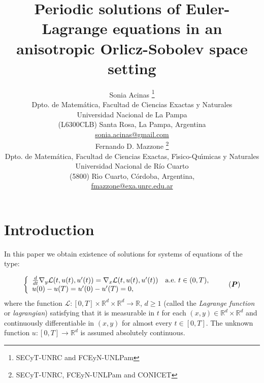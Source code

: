 \documentclass[twoside]{article}
\title{Periodic solutions of
Euler-Lagrange equations in an anisotropic Orlicz-Sobolev space setting  }
\author{Sonia Acinas \thanks{SECyT-UNRC and  FCEyN-UNLPam}\\
Dpto. de Matem\'atica, Facultad de Ciencias Exactas y Naturales\\
Universidad Nacional de La Pampa\\
(L6300CLB) Santa Rosa, La Pampa, Argentina\\
\url{sonia.acinas@gmail.com}\\[3mm]
Fernando D. Mazzone \thanks{SECyT-UNRC, FCEyN-UNLPam and CONICET}\\
Dpto. de Matem\'atica, Facultad de Ciencias Exactas, F\'{\i}sico-Qu\'{\i}micas y Naturales\\
Universidad Nacional de R\'{i}o Cuarto\\
(5800) R\'{\i}o Cuarto, C\'ordoba, Argentina,\\
\url{fmazzone@exa.unrc.edu.ar}
}
\date{}
\theoremstyle{remark}
\renewcommand{\b}[1]{\boldsymbol{#1}}
\newcommand{\rr}{\mathbb{R}}
\renewcommand{\geq}{\geqslant}
\begin{document}
\maketitle
%
\begingroup%
    \renewcommand{\thefootnote}{}%
    \endgroup
%
%
%
%

\begin{abstract}


\end{abstract}






\pagestyle{fancy} \headheight 35pt \fancyhead{} \fancyfoot{}

\fancyfoot[C]{\thepage}  \fancyhead[CO]{\nouppercase{\section}}

\fancyhead[CO]{\nouppercase{\leftmark}}






\section{Introduction}


In this paper we obtain existence of solutions for systems  of equations of the type:

\begin{equation}\label{ProbPrin-gral}
    \left\{%
\begin{array}{ll}
  \frac{d}{dt} \nabla_y\mathcal{L}(t,u(t),u'(t))= \nabla_x\mathcal{L}(t,u(t),u'(t)) \quad \hbox{a.e.}\ t \in (0,T),\\
    u(0)-u(T)=u'(0)-u'(T)=0,
\end{array}%
\right. \tag{$\b{P}$}
\end{equation}
where the function $\mathcal{L}:[0,T]\times\rr^d\times\rr^d\to\rr$, $d\geq 1$ (called the \emph{Lagrange function} or \emph{lagrangian}) satisfying  that  it is measurable in $t$ for each $(x,y)\in \rr^d\times\rr^d$ and  continuously differentiable in $(x,y)$ for almost every $t \in [0,T]$. The unknown function  $u:[0,T]\to\rr^d$ is assumed absolutely continuous. 
\end{document}
